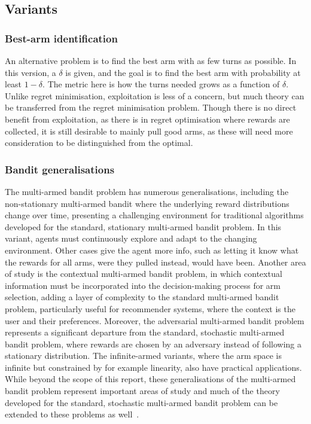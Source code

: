 \subsection{Variants}
\subsubsection{Best-arm identification}
An alternative problem is to find the best arm with as few turns as possible.
In this version, a $\delta$ is given, and the goal is to find the best arm with probability at least $1-\delta$.
The metric here is how the turns needed grows as a function of $\delta$.
Unlike regret minimisation, exploitation is less of a concern, but much theory can be transferred from the regret minimisation problem.
Though there is no direct benefit from exploitation, as there is in regret optimisation where rewards are collected, it is still desirable to mainly pull good arms, as these will need more consideration to be distinguished from the optimal.

\subsubsection{Bandit generalisations}
The multi-armed bandit problem has numerous generalisations, including the non-stationary multi-armed bandit where the underlying reward distributions change over time, presenting a challenging environment for traditional algorithms developed for the standard, stationary multi-armed bandit problem.
In this variant, agents must continuously explore and adapt to the changing environment.
Other cases give the agent more info, such as letting it know what the rewards for all arms, were they pulled instead, would have been.
Another area of study is the contextual multi-armed bandit problem, in which contextual information must be incorporated into the decision-making process for arm selection, adding a layer of complexity to the standard multi-armed bandit problem, particularly useful for recommender systems, where the context is the user and their preferences.
Moreover, the adversarial multi-armed bandit problem represents a significant departure from the standard, stochastic multi-armed bandit problem, where rewards are chosen by an adversary instead of following a stationary distribution.
The infinite-armed variants, where the arm space is infinite but constrained by for example linearity, also have practical applications.
While beyond the scope of this report, these generalisations of the multi-armed bandit problem represent important areas of study and much of the theory developed for the standard, stochastic multi-armed bandit problem can be extended to these problems as well~\autocite{slivkins2019,lattimore2020}.


